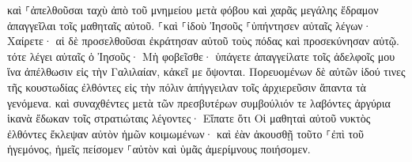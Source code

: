 \documentclass{openreader}
\begin{document}
καὶ ⸀ἀπελθοῦσαι ταχὺ ἀπὸ τοῦ μνημείου μετὰ φόβου καὶ χαρᾶς μεγάλης ἔδραμον ἀπαγγεῖλαι τοῖς μαθηταῖς αὐτοῦ. 
⸀καὶ ⸀ἰδοὺ Ἰησοῦς ⸀ὑπήντησεν αὐταῖς λέγων· Χαίρετε· αἱ δὲ προσελθοῦσαι ἐκράτησαν αὐτοῦ τοὺς πόδας καὶ προσεκύνησαν αὐτῷ. 
τότε λέγει αὐταῖς ὁ Ἰησοῦς· Μὴ φοβεῖσθε· ὑπάγετε ἀπαγγείλατε τοῖς ἀδελφοῖς μου ἵνα ἀπέλθωσιν εἰς τὴν Γαλιλαίαν, κἀκεῖ με ὄψονται. 
Πορευομένων δὲ αὐτῶν ἰδού τινες τῆς κουστωδίας ἐλθόντες εἰς τὴν πόλιν ἀπήγγειλαν τοῖς ἀρχιερεῦσιν ἅπαντα τὰ γενόμενα. 
καὶ συναχθέντες μετὰ τῶν πρεσβυτέρων συμβούλιόν τε λαβόντες ἀργύρια ἱκανὰ ἔδωκαν τοῖς στρατιώταις 
λέγοντες· Εἴπατε ὅτι Οἱ μαθηταὶ αὐτοῦ νυκτὸς ἐλθόντες ἔκλεψαν αὐτὸν ἡμῶν κοιμωμένων· 
καὶ ἐὰν ἀκουσθῇ τοῦτο ⸀ἐπὶ τοῦ ἡγεμόνος, ἡμεῖς πείσομεν ⸀αὐτὸν καὶ ὑμᾶς ἀμερίμνους ποιήσομεν. 
\end{document}
